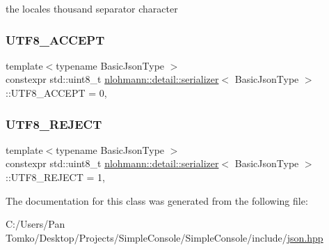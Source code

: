 the locale\textquotesingle{}s thousand separator character 

\mbox{\label{classnlohmann_1_1detail_1_1serializer_a2311a8c756c4a119aa82cd55301d13bc}} 
\subsubsection{\texorpdfstring{UTF8\_ACCEPT}{UTF8\_ACCEPT}}
{\footnotesize\ttfamily template$<$typename Basic\+Json\+Type $>$ \\
constexpr std\+::uint8\+\_\+t \mbox{\hyperlink{classnlohmann_1_1detail_1_1serializer}{nlohmann\+::detail\+::serializer}}$<$ Basic\+Json\+Type $>$\+::U\+T\+F8\+\_\+\+A\+C\+C\+E\+PT = 0\hspace{0.3cm}{\ttfamily [static]}, {\ttfamily [private]}}

\mbox{\label{classnlohmann_1_1detail_1_1serializer_a833bd5805e4380549f4e21c304820d6d}} 
\subsubsection{\texorpdfstring{UTF8\_REJECT}{UTF8\_REJECT}}
{\footnotesize\ttfamily template$<$typename Basic\+Json\+Type $>$ \\
constexpr std\+::uint8\+\_\+t \mbox{\hyperlink{classnlohmann_1_1detail_1_1serializer}{nlohmann\+::detail\+::serializer}}$<$ Basic\+Json\+Type $>$\+::U\+T\+F8\+\_\+\+R\+E\+J\+E\+CT = 1\hspace{0.3cm}{\ttfamily [static]}, {\ttfamily [private]}}



The documentation for this class was generated from the following file\+:\begin{DoxyCompactItemize}
\item 
C\+:/\+Users/\+Pan Tomko/\+Desktop/\+Projects/\+Simple\+Console/\+Simple\+Console/include/\mbox{\hyperlink{json_8hpp}{json.\+hpp}}\end{DoxyCompactItemize}
